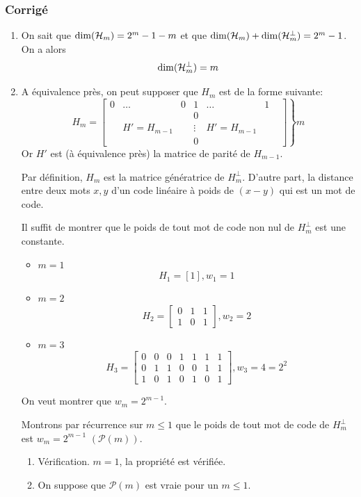 \documentclass[a4paper,10pt,twocolumn]{article}
\theoremstyle{break}
\newcommand{\code}[1]{\mathcal{#1}}
\newcommand{\dimc}[1]{\mathop{\rm{dim}}(#1)}
\begin{document}
\subsubsection*{Corrigé}
\begin{enumerate}
 \item On sait que $\dimc{\code{H}_m} = 2^m - 1 - m$ et que $\dimc{\code{H}_m} + \dimc{\code{H}_m^\bot} = 2^m - 1$. On a alors
 $$ \dimc{\code{H}_m^\bot} = m $$

 \item A équivalence près, on peut supposer que $H_m$ est de la forme suivante:
 $$ H_m = \left.
\begin{bmatrix}
 0 & \ldots & 0 & 1 & \ldots & 1 \\
 & & & 0 & & \\
 & H' = H_{m-1} & & \vdots & H' = H_{m-1} & & \\
 & & & 0 & &  
\end{bmatrix}\right\}m$$
 Or $H'$ est (à équivalence près) la matrice de parité de $H_{m-1}$.
 
 Par définition, $H_m$ est la matrice génératrice de $H_m^\bot$. D'autre part,
 la distance entre deux mots $x,y$ d'un code linéaire à poids de $(x-y)$ qui est un mot de code.
 
 Il suffit de montrer que le poids de tout mot de code non nul de $H_m^\bot$ est une constante.
 \begin{itemize}
  \item $m=1$ $$H_1=[1], w_1=1$$
  \item $m=2$ $$H_2=\begin{bmatrix} 0 & 1 & 1 \\ 1 & 0 & 1 \end{bmatrix}, w_2=2$$
  \item $m=3$ $$H_3=
   \begin{bmatrix}
    0 & 0 & 0 & 1 & 1 & 1 & 1 \\
    0 & 1 & 1 & 0 & 0 & 1 & 1 \\
    1 & 0 & 1 & 0 & 1 & 0 & 1
   \end{bmatrix}, w_3=4=2^2$$
 \end{itemize}
 On veut montrer que $w_m=2^{m-1}$.
 
 Montrons par récurrence sur $m \le 1$ que le poids de tout mot de code de $H_m^\bot$ est $w_m=2^{m-1}$ $(\mathcal{P}(m))$.
 \begin{enumerate}
  \item Vérification. $m=1$, la propriété est vérifiée.
  \item On suppose que $\mathcal{P}(m)$ est vraie pour un $m \le 1$.
  

\end{enumerate}
\end{enumerate}
\end{document}
